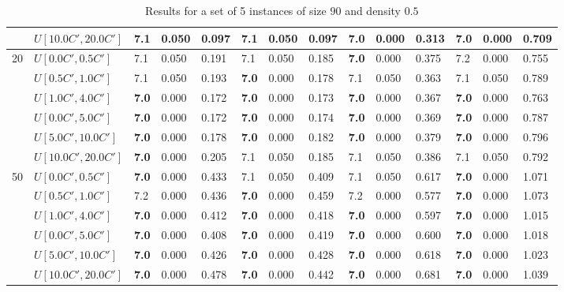 \begin{table}[h]
{\begin{tabular}{|l|l||l|l|l||l|l|l||l|l|l||l|l|l|}
       & $U[10.0C',20.0C']$ & 7.1 & 0.050 & 0.097 & 7.1 & 0.050 & 0.097 & \textbf{7.0} & 0.000 & 0.313 & \textbf{7.0} & 0.000 & 0.709 \\
      \hline\hline
      \multirow{6}{*}{20} & $U[0.0C',0.5C']$ & 7.1 & 0.050 & 0.191 & 7.1 & 0.050 & 0.185 & \textbf{7.0} & 0.000 & 0.375 & 7.2 & 0.000 & 0.755 \\
       & $U[0.5C',1.0C']$ & 7.1 & 0.050 & 0.193 & \textbf{7.0} & 0.000 & 0.178 & 7.1 & 0.050 & 0.363 & 7.1 & 0.050 & 0.789 \\
       & $U[1.0C',4.0C']$ & \textbf{7.0} & 0.000 & 0.172 & \textbf{7.0} & 0.000 & 0.173 & \textbf{7.0} & 0.000 & 0.367 & \textbf{7.0} & 0.000 & 0.763 \\
       & $U[0.0C',5.0C']$ & \textbf{7.0} & 0.000 & 0.172 & \textbf{7.0} & 0.000 & 0.174 & \textbf{7.0} & 0.000 & 0.369 & \textbf{7.0} & 0.000 & 0.787 \\
       & $U[5.0C',10.0C']$ & \textbf{7.0} & 0.000 & 0.178 & \textbf{7.0} & 0.000 & 0.182 & \textbf{7.0} & 0.000 & 0.379 & \textbf{7.0} & 0.000 & 0.796 \\
       & $U[10.0C',20.0C']$ & \textbf{7.0} & 0.000 & 0.205 & 7.1 & 0.050 & 0.185 & 7.1 & 0.050 & 0.386 & 7.1 & 0.050 & 0.792 \\
      \hline\hline
      \multirow{6}{*}{50} & $U[0.0C',0.5C']$ & \textbf{7.0} & 0.000 & 0.433 & 7.1 & 0.050 & 0.409 & 7.1 & 0.050 & 0.617 & \textbf{7.0} & 0.000 & 1.071 \\
       & $U[0.5C',1.0C']$ & 7.2 & 0.000 & 0.436 & \textbf{7.0} & 0.000 & 0.459 & 7.2 & 0.000 & 0.577 & \textbf{7.0} & 0.000 & 1.073 \\
       & $U[1.0C',4.0C']$ & \textbf{7.0} & 0.000 & 0.412 & \textbf{7.0} & 0.000 & 0.418 & \textbf{7.0} & 0.000 & 0.597 & \textbf{7.0} & 0.000 & 1.015 \\
       & $U[0.0C',5.0C']$ & \textbf{7.0} & 0.000 & 0.408 & \textbf{7.0} & 0.000 & 0.419 & \textbf{7.0} & 0.000 & 0.600 & \textbf{7.0} & 0.000 & 1.018 \\
       & $U[5.0C',10.0C']$ & \textbf{7.0} & 0.000 & 0.426 & \textbf{7.0} & 0.000 & 0.428 & \textbf{7.0} & 0.000 & 0.618 & \textbf{7.0} & 0.000 & 1.023 \\
       & $U[10.0C',20.0C']$ & \textbf{7.0} & 0.000 & 0.478 & \textbf{7.0} & 0.000 & 0.442 & \textbf{7.0} & 0.000 & 0.681 & \textbf{7.0} & 0.000 & 1.039 \\
      \hline
      \end{tabular}
      }
      \caption{Results for a set of 5 instances of size $90$ and density $0.5$}
      \label{tab:pcpn90p5}\end{table}


